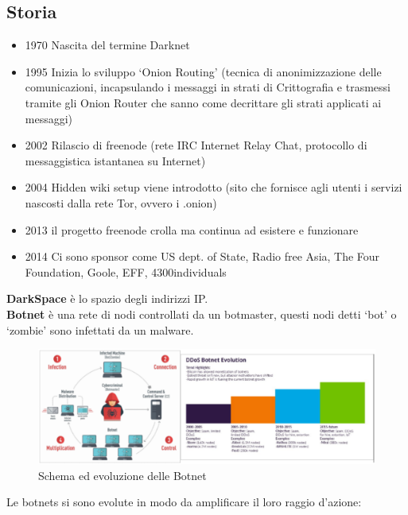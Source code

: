 \documentclass[8pt]{extarticle}
\begin{document}
\subsection{Storia}
\begin{itemize}
    \item 1970 Nascita del termine Darknet
    \item 1995 Inizia lo sviluppo ‘Onion Routing’ (tecnica di anonimizzazione delle comunicazioni, incapsulando i messaggi in strati di 
    Crittografia e trasmessi tramite gli Onion Router che sanno come decrittare gli strati applicati ai messaggi)
    \item 2002 Rilascio di freenode (rete IRC Internet Relay Chat, protocollo di messaggistica istantanea su Internet)
    \item 2004 Hidden wiki setup viene introdotto (sito che fornisce agli utenti i servizi nascosti dalla rete Tor, ovvero i .onion)
    \item 2013 il progetto freenode crolla ma continua ad esistere e funzionare
    \item 2014 Ci sono sponsor come US dept. of State,  Radio free Asia, The Four Foundation, Goole, EFF, 4300individuals
\end{itemize}
\textbf{DarkSpace} è lo spazio degli indirizzi IP. \\
\textbf{Botnet} è una rete di nodi controllati da un botmaster, questi nodi detti ‘bot’ o ‘zombie’ sono infettati da un malware.\\
\begin{figure}[H]
    \center
    \includegraphics[scale=0.22]{images/DK1.png}
    \caption{Schema ed evoluzione delle Botnet}\label{fig:1}
\end{figure}
Le botnets si sono evolute in modo da amplificare il loro raggio d’azione:
\end{document}
